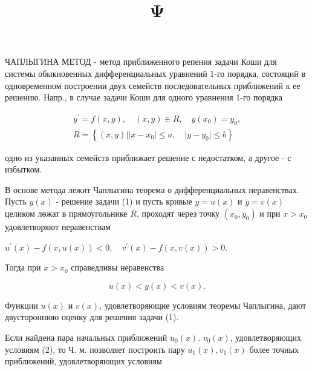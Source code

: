 \documentclass[10pt]{article}
\title{$\mathbf{\Psi}$ }
\author{}
\date{}
\begin{document}
\maketitle

ЧАПЛЫГИНА МЕТОД - метод приближенного репения задачи Коши для системы обыкновенных дифференциальных уравнений 1-го порядка, состояций в одновременном построении двух семейств последовательных приближений к ее решению. Напр., в случае задачи Коши для одного уравнения 1-го порядка



\[

\begin{gathered}

y^{\prime}=f(x, y), \quad(x, y) \in R, \quad y\left(x_{0}\right)=y_{0}, \\

R=\left\{(x, y)|| x-x_{0}|\leqslant a, \quad| y-y_{0} \mid \leqslant b\right\}

\end{gathered}

\]



одно из указанных семейств приближает решение с недостатком, а другое - с избытком.



В основе метода лежит Чаплыгина теорема о дифференциальных неравенствах. Пусть $y(x)$ - решение задачи (1) и пусть кривые $y=u(x)$ и $y=v(x)$ целиком лөжат в прямоугольнике $R$, проходят через точку $\left(x_{0}, y_{0}\right)$ и при $x>x_{0}$ удовлетворяют неравенствам



$u^{\prime}(x)-f(x, u(x))<0, \quad v^{\prime}(x)-f(x, v(x))>0$.



Тогда при $x>x_{0}$ справедливы неравенства



\[

u(x)<y(x)<v(x) .

\]



Функции $u(x)$ и $v(x)$, удовлетворяющие условиям теоремы Чаплыгина, дают двустороннюю оценку для решения задачи (1).



Если найдена пара начальных приближений $u_{0}(x)$. $v_{0}(x)$, удовлетворяющих условиям (2), то Ч. м. позволяет построить пару $u_{1}(x), v_{1}(x)$ более точных приближений, удовлетворяющих условиям
\end{document}
